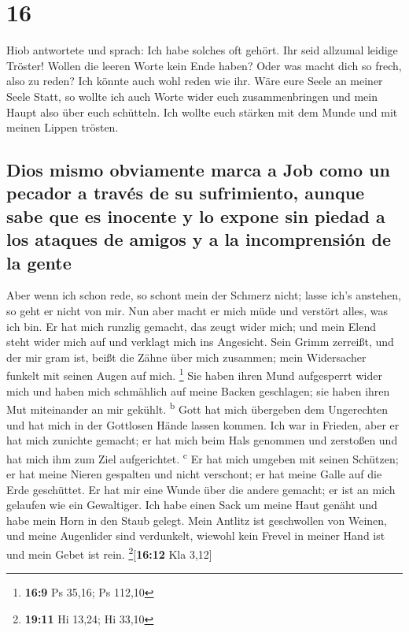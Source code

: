 \hypertarget{section-15}{%
\section{16}\label{section-15}}

 Hiob antwortete und sprach:  Ich habe
solches oft gehört. Ihr seid allzumal leidige Tröster! 
Wollen die leeren Worte kein Ende haben? Oder was macht dich so frech,
also zu reden?  Ich könnte auch wohl reden wie ihr. Wäre
eure Seele an meiner Seele Statt, so wollte ich auch Worte wider euch
zusammenbringen und mein Haupt also über euch schütteln. 
Ich wollte euch stärken mit dem Munde und mit meinen Lippen trösten.

\hypertarget{dios-mismo-obviamente-marca-a-job-como-un-pecador-a-travuxe9s-de-su-sufrimiento-aunque-sabe-que-es-inocente-y-lo-expone-sin-piedad-a-los-ataques-de-amigos-y-a-la-incomprensiuxf3n-de-la-gente}{%
\subsection{Dios mismo obviamente marca a Job como un pecador a través
de su sufrimiento, aunque sabe que es inocente y lo expone sin piedad a
los ataques de amigos y a la incomprensión de la
gente}\label{dios-mismo-obviamente-marca-a-job-como-un-pecador-a-travuxe9s-de-su-sufrimiento-aunque-sabe-que-es-inocente-y-lo-expone-sin-piedad-a-los-ataques-de-amigos-y-a-la-incomprensiuxf3n-de-la-gente}}

 Aber wenn ich schon rede, so schont mein der Schmerz
nicht; lasse ich's anstehen, so geht er nicht von mir. 
Nun aber macht er mich müde und verstört alles, was ich bin.
 Er hat mich runzlig gemacht, das zeugt wider mich; und
mein Elend steht wider mich auf und verklagt mich ins Angesicht.
 Sein Grimm zerreißt, und der mir gram ist, beißt die
Zähne über mich zusammen; mein Widersacher funkelt mit seinen Augen auf
mich. \footnote{\textbf{16:9} Ps 35,16; Ps 112,10}  Sie
haben ihren Mund aufgesperrt wider mich und haben mich schmählich auf
meine Backen geschlagen; sie haben ihren Mut miteinander an mir gekühlt.
\textsuperscript{b}  Gott hat mich übergeben dem
Ungerechten und hat mich in der Gottlosen Hände lassen kommen.
 Ich war in Frieden, aber er hat mich zunichte gemacht;
er hat mich beim Hals genommen und zerstoßen und hat mich ihm zum Ziel
aufgerichtet. \textsuperscript{c}  Er hat mich umgeben
mit seinen Schützen; er hat meine Nieren gespalten und nicht verschont;
er hat meine Galle auf die Erde geschüttet.  Er hat mir
eine Wunde über die andere gemacht; er ist an mich gelaufen wie ein
Gewaltiger.  Ich habe einen Sack um meine Haut genäht und
habe mein Horn in den Staub gelegt.  Mein Antlitz ist
geschwollen von Weinen, und meine Augenlider sind verdunkelt,
 wiewohl kein Frevel in meiner Hand ist und mein Gebet
ist rein. \footnote{\textbf{19:11} Hi 13,24; Hi 33,10}{[}\textbf{16:12}
Kla 3,12{]}

